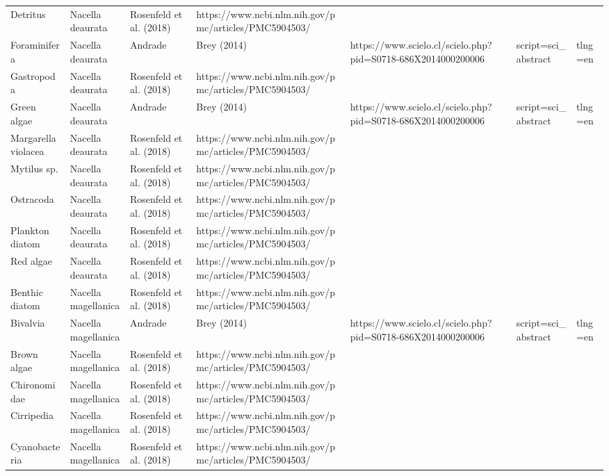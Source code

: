 \documentclass[
]{article}
\begin{document}
\begin{landscape}
\begin{longtable}[t]{>{\raggedright\arraybackslash}p{4cm}>{\centering\arraybackslash}p{4cm}>{\centering\arraybackslash}p{6cm}>{\centering\arraybackslash}p{6cm}}
Detritus & Nacella deaurata & \tiny Rosenfeld et al. (2018) & \tiny https://www.ncbi.nlm.nih.gov/pmc/articles/PMC5904503/\\
Foraminifera & Nacella deaurata & \tiny Andrade & Brey (2014) & \tiny https://www.scielo.cl/scielo.php?pid=S0718-686X2014000200006&script=sci_abstract&tlng=en\\
\addlinespace
Gastropoda & Nacella deaurata & \tiny Rosenfeld et al. (2018) & \tiny https://www.ncbi.nlm.nih.gov/pmc/articles/PMC5904503/\\
Green algae & Nacella deaurata & \tiny Andrade & Brey (2014) & \tiny https://www.scielo.cl/scielo.php?pid=S0718-686X2014000200006&script=sci_abstract&tlng=en\\
Margarella violacea & Nacella deaurata & \tiny Rosenfeld et al. (2018) & \tiny https://www.ncbi.nlm.nih.gov/pmc/articles/PMC5904503/\\
Mytilus sp. & Nacella deaurata & \tiny Rosenfeld et al. (2018) & \tiny https://www.ncbi.nlm.nih.gov/pmc/articles/PMC5904503/\\
Ostracoda & Nacella deaurata & \tiny Rosenfeld et al. (2018) & \tiny https://www.ncbi.nlm.nih.gov/pmc/articles/PMC5904503/\\
\addlinespace
Plankton diatom & Nacella deaurata & \tiny Rosenfeld et al. (2018) & \tiny https://www.ncbi.nlm.nih.gov/pmc/articles/PMC5904503/\\
Red algae & Nacella deaurata & \tiny Rosenfeld et al. (2018) & \tiny https://www.ncbi.nlm.nih.gov/pmc/articles/PMC5904503/\\
Benthic diatom & Nacella magellanica & \tiny Rosenfeld et al. (2018) & \tiny https://www.ncbi.nlm.nih.gov/pmc/articles/PMC5904503/\\
Bivalvia & Nacella magellanica & \tiny Andrade & Brey (2014) & \tiny https://www.scielo.cl/scielo.php?pid=S0718-686X2014000200006&script=sci_abstract&tlng=en\\
Brown algae & Nacella magellanica & \tiny Rosenfeld et al. (2018) & \tiny https://www.ncbi.nlm.nih.gov/pmc/articles/PMC5904503/\\
\addlinespace
Chironomidae & Nacella magellanica & \tiny Rosenfeld et al. (2018) & \tiny https://www.ncbi.nlm.nih.gov/pmc/articles/PMC5904503/\\
Cirripedia & Nacella magellanica & \tiny Rosenfeld et al. (2018) & \tiny https://www.ncbi.nlm.nih.gov/pmc/articles/PMC5904503/\\
Cyanobacteria & Nacella magellanica & \tiny Rosenfeld et al. (2018) & \tiny https://www.ncbi.nlm.nih.gov/pmc/articles/PMC5904503/\\

\end{longtable}
\end{landscape}
\end{document}
